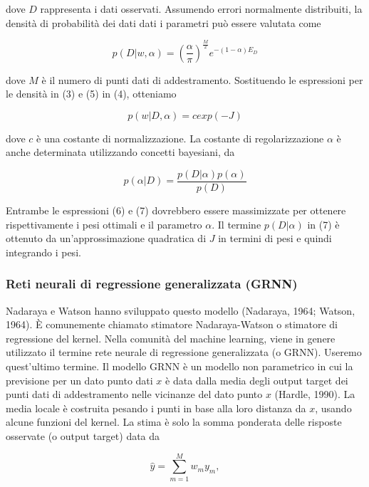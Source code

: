 \documentclass[12pt,a4paper]{report}
\begin{document}
dove $D$ rappresenta i dati osservati. Assumendo errori normalmente distribuiti, la densità di probabilità dei dati dati i parametri può essere valutata come

\begin{equation}
{ \displaystyle p(D \vert w, \alpha) = \left( \frac{\alpha}{\pi} \right)^{\frac{M}{2}}  e^{-(1 - \alpha)E_D} }
\end{equation}

dove $M$ è il numero di punti dati di addestramento. Sostituendo le espressioni per le densità in (3) e (5) in (4), otteniamo

\begin{equation}
{ \displaystyle p(w \vert D, \alpha) = c exp(-J) }
\end{equation}

dove $c$ è una costante di normalizzazione. La costante di regolarizzazione $\alpha$ è anche determinata utilizzando concetti bayesiani, da

\begin{equation}
{ \displaystyle p(\alpha \vert D) = \frac{p(D \vert \alpha)p(\alpha)}{p(D)} }
\end{equation}

Entrambe le espressioni (6) e (7) dovrebbero essere massimizzate per ottenere rispettivamente i pesi ottimali e il parametro $\alpha$. Il termine $p(D \vert \alpha)$ in (7) è ottenuto da un'approssimazione quadratica di $J$ in termini di pesi e quindi integrando i pesi. 

\subsubsection{Reti neurali di regressione generalizzata (GRNN)}
Nadaraya e Watson hanno sviluppato questo modello (Nadaraya, 1964; Watson, 1964).
È comunemente chiamato stimatore Nadaraya-Watson o stimatore di regressione del kernel. Nella comunità del machine learning, viene in genere utilizzato il termine rete neurale di regressione generalizzata (o GRNN). Useremo quest'ultimo termine. Il modello GRNN è un modello non parametrico in cui la previsione per un dato punto dati $x$ è data dalla media degli output target dei punti dati di addestramento nelle vicinanze del dato punto $x$ (Hardle, 1990). La media locale è costruita pesando i punti in base alla loro distanza da $x$, usando alcune funzioni del kernel. La stima è solo la somma ponderata delle risposte osservate (o output target) data da

\begin{equation}
    { \displaystyle \hat{y} = \sum\limits_{m=1}^{M} w_my_m},
\end{equation}
\end{document}
